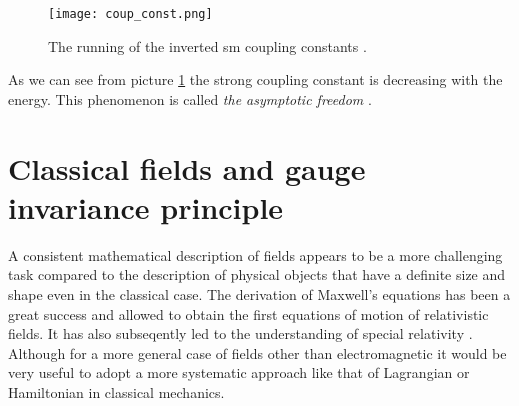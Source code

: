 	 \begin{figure}[htpb]
	 	\centering
	\texttt{[image: coup\_const.png]}
	\caption{The running of the inverted \gls{sm} coupling constants \cite{coupl_wiki}. }
	\label{fig::running}
	\end{figure}
As we can see from picture \ref{fig::running} the strong coupling constant is decreasing with the energy. This phenomenon is called \textit{the asymptotic freedom} \cite{Gross,Politzer,Vanyashin}.



\section{Classical fields and gauge invariance principle}
\label{sec::gauge}
A consistent mathematical description of fields appears to be a more challenging task compared to the description of physical objects that have a definite size and shape even in the classical case. The derivation of Maxwell's equations has been a great success and allowed to obtain the first equations of motion of relativistic fields. It has also subseqently led to the understanding of special relativity \cite{einstein,poincare,lorentz}. Although for a more general case of fields other than electromagnetic it would be very useful to adopt a more systematic approach like that of Lagrangian or Hamiltonian in classical mechanics. 

